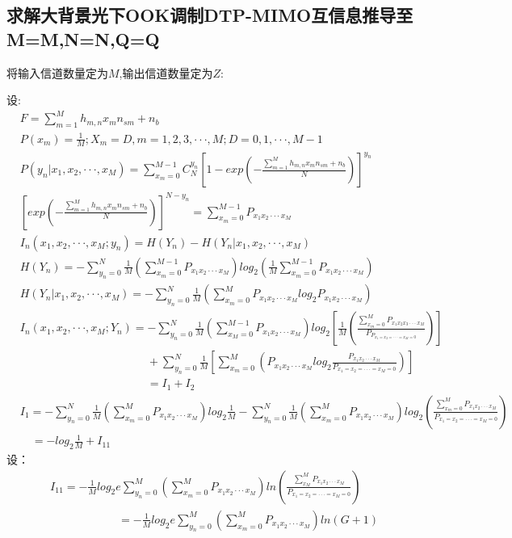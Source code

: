 \documentclass[12pt]{article}
\begin{document}
\subsection{求解大背景光下OOK调制DTP-MIMO互信息推导至M=M,N=N,Q=Q}
将输入信道数量定为$M$,输出信道数量定为$Z$:\par
设:
\begin{equation*}
  \begin{aligned}
    &F=\sum\limits_{m=1}^Mh_{m,n}x_mn_{sm}+n_b\\
    &P(x_m)=\frac{1}{M};X_m=D,m=1,2,3,···,M;D=0,1,···,M-1\\
    &P(y_n|x_1,x_2,···,x_M) = \sum_{x_m=0}^{M-1}C_N^{y_n}\left[1-exp\left(-\frac{\sum_{m=1}^Mh_{m,n}x_mn_{sm}+n_b}{N}\right)\right]^{y_n}\\
    &\left[exp\left(-\frac{\sum_{m=1}^Mh_{m,n}x_mn_{sm}+n_b}{N}\right)\right]^{N-y_n}  = \sum_{x_m=0}^{M-1}P_{x_1x_2···x_M}\\
    & I_n(x_1,x_2,···,x_M;y_n)=H(Y_n)-H(Y_n|x_1,x_2,···,x_M)\\
    & H(Y_n)=-\sum_{y_n=0}^N\frac{1}{M}\left(\sum_{x_m=0}^{M-1}P_{x_1x_2···x_M}\right)log_2\left(\frac{1}{M}\sum_{x_m=0}^{M-1}P_{x_1x_2···x_M}\right)\\
    & H(Y_n|x_1,x_2,···,x_M)=-\sum_{y_n=0}^N\frac{1}{M}\left(\sum_{x_m=0}^{M}P_{x_1x_2···x_M}log_2P_{x_1x_2···x_M}\right) \\
    &I_n(x_1,x_2,···,x_M;Y_n)=-\sum_{y_n=0}^N\frac{1}{M}\left(\sum_{x_M=0}^{M-1}P_{x_1x_2···x_M}\right)log_2\left[\frac{1}{M}\left(\frac{\sum_{x_m=0}^{M}P_{x_1x_2x_3···x_M}}{P_{P_{x_1=x_2=···=x_M=0}}}\right)\right]\\
    &\qquad\qquad\qquad\quad\qquad\qquad\ +\sum_{y_n=0}^{N}\frac{1}{M}\left[\sum_{x_m=0}^M\left(P_{x_1x_2···x_M}log_2\frac{P_{x_1x_2···x_M}}{P_{x_1=x_2=···=x_M=0}}\right)\right]\\
    &\qquad\qquad\qquad\quad\qquad\qquad\ =I_1+I_2\\
    &I_1=-\sum_{y_n=0}^{N}\frac{1}{M}\left(\sum_{x_m=0}^{M}P_{x_1x_2···x_M}\right)log_2\frac{1}{M}-\sum_{y_n=0}^{N}\frac{1}{M}\left(\sum_{x_m=0}^{M}P_{x_1x_2···x_M}\right)log_2\left(\frac{\sum_{x_m=0}^{M}P_{x_1x_2···x_M}}{P_{x_1=x_2=···=x_M=0}}\right)\\
    &\quad=-log_2\frac{1}{M}+I_{11}
  \end{aligned}
\end{equation*}
\newpage
设：
\begin{equation*}
  \begin{aligned}
    &I_{11}=-\frac{1}{M}log_2e\sum_{y_n=0}^{M}\left(\sum_{x_m=0}^{M}P_{x_1x_2···x_M}\right)ln\left(\frac{\sum_{x_M}^MP_{x_1x_2···x_M}}{P_{x_1=x_2=···=x_M=0}}\right)\\
    &\qquad\qquad\qquad=-\frac{1}{M}log_2e\sum_{y_n=0}^{M}\left(\sum_{x_m=0}^{M}P_{x_1x_2···x_M}\right)ln\left(G+1\right)
  \end{aligned}
\end{equation*}
\end{document}
